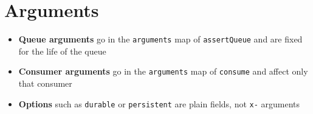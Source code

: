 \documentclass[11pt,a4paper]{article}
\begin{document}
\newpage
\section{Arguments}



\begin{itemize}\itemsep2pt
  \item \textbf{Queue arguments} go in the \lstinline|arguments| map of
        \lstinline|assertQueue| and are fixed for the life of the queue
  \item \textbf{Consumer arguments} go in the \lstinline|arguments| map of
        \lstinline|consume| and affect only that consumer
  \item \textbf{Options} such as \lstinline|durable| or \lstinline|persistent| are plain
        fields, not \lstinline|x-| arguments
\end{itemize}
\end{document}

